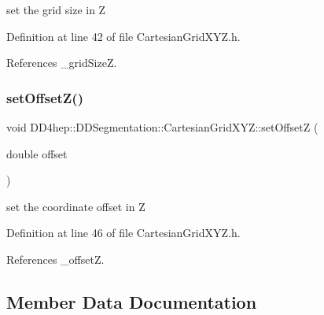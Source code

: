 set the grid size in Z 



Definition at line 42 of file Cartesian\+Grid\+X\+Y\+Z.\+h.



References \+\_\+grid\+SizeZ.

\hypertarget{class_d_d4hep_1_1_d_d_segmentation_1_1_cartesian_grid_x_y_z_a1026999b123d8140f6e710abf9977cef}{}\label{class_d_d4hep_1_1_d_d_segmentation_1_1_cartesian_grid_x_y_z_a1026999b123d8140f6e710abf9977cef} 
\subsubsection{\texorpdfstring{set\+Offset\+Z()}{setOffsetZ()}}
{\footnotesize\ttfamily void D\+D4hep\+::\+D\+D\+Segmentation\+::\+Cartesian\+Grid\+X\+Y\+Z\+::set\+OffsetZ (\begin{DoxyParamCaption}\item[{double}]{offset }\end{DoxyParamCaption})\hspace{0.3cm}{\ttfamily [inline]}}



set the coordinate offset in Z 



Definition at line 46 of file Cartesian\+Grid\+X\+Y\+Z.\+h.



References \+\_\+offsetZ.



\subsection{Member Data Documentation}
\hypertarget{class_d_d4hep_1_1_d_d_segmentation_1_1_cartesian_grid_x_y_z_a9e67a94e0fb2dfa8d3343c95d9c04ad0}{}\label{class_d_d4hep_1_1_d_d_segmentation_1_1_cartesian_grid_x_y_z_a9e67a94e0fb2dfa8d3343c95d9c04ad0} 
